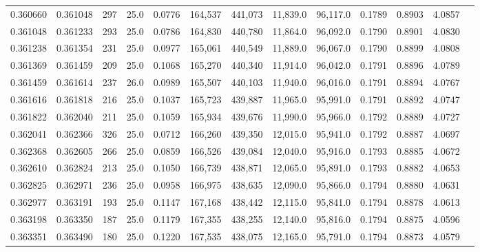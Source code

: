 \begin{tabular}{rrrrrrrrrrrrr}
0.360660 & 0.361048 &   297 & 25.0 &                                     0.0776 & 164,537 & 441,073 &  11,839.0 &  96,117.0 & 0.1789 & 0.8903 & 4.0857 \\
0.361048 & 0.361233 &   293 & 25.0 &                                     0.0786 & 164,830 & 440,780 &  11,864.0 &  96,092.0 & 0.1790 & 0.8901 & 4.0830 \\
0.361238 & 0.361354 &   231 & 25.0 &                                     0.0977 & 165,061 & 440,549 &  11,889.0 &  96,067.0 & 0.1790 & 0.8899 & 4.0808 \\
0.361369 & 0.361459 &   209 & 25.0 &                                     0.1068 & 165,270 & 440,340 &  11,914.0 &  96,042.0 & 0.1791 & 0.8896 & 4.0789 \\
0.361459 & 0.361614 &   237 & 26.0 &                                     0.0989 & 165,507 & 440,103 &  11,940.0 &  96,016.0 & 0.1791 & 0.8894 & 4.0767 \\
0.361616 & 0.361818 &   216 & 25.0 &                                     0.1037 & 165,723 & 439,887 &  11,965.0 &  95,991.0 & 0.1791 & 0.8892 & 4.0747 \\
0.361822 & 0.362040 &   211 & 25.0 &                                     0.1059 & 165,934 & 439,676 &  11,990.0 &  95,966.0 & 0.1792 & 0.8889 & 4.0727 \\
0.362041 & 0.362366 &   326 & 25.0 &                                     0.0712 & 166,260 & 439,350 &  12,015.0 &  95,941.0 & 0.1792 & 0.8887 & 4.0697 \\
0.362368 & 0.362605 &   266 & 25.0 &                                     0.0859 & 166,526 & 439,084 &  12,040.0 &  95,916.0 & 0.1793 & 0.8885 & 4.0672 \\
0.362610 & 0.362824 &   213 & 25.0 &                                     0.1050 & 166,739 & 438,871 &  12,065.0 &  95,891.0 & 0.1793 & 0.8882 & 4.0653 \\
0.362825 & 0.362971 &   236 & 25.0 &                                     0.0958 & 166,975 & 438,635 &  12,090.0 &  95,866.0 & 0.1794 & 0.8880 & 4.0631 \\
0.362977 & 0.363191 &   193 & 25.0 &                                     0.1147 & 167,168 & 438,442 &  12,115.0 &  95,841.0 & 0.1794 & 0.8878 & 4.0613 \\
0.363198 & 0.363350 &   187 & 25.0 &                                     0.1179 & 167,355 & 438,255 &  12,140.0 &  95,816.0 & 0.1794 & 0.8875 & 4.0596 \\
0.363351 & 0.363490 &   180 & 25.0 &                                     0.1220 & 167,535 & 438,075 &  12,165.0 &  95,791.0 & 0.1794 & 0.8873 & 4.0579 \\

\end{tabular}
